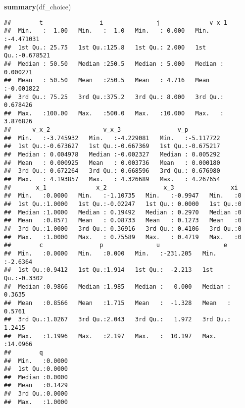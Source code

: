 \documentclass[
]{book}
\newenvironment{Shaded}{\begin{snugshade}}{\end{snugshade}}
\newcommand{\KeywordTok}[1]{\textcolor[rgb]{0.13,0.29,0.53}{\textbf{#1}}}
\newcommand{\NormalTok}[1]{#1}
\begin{document}
\begin{Shaded}
\begin{Highlighting}[]
\KeywordTok{summary}\NormalTok{(df_choice)}
\end{Highlighting}
\end{Shaded}

\begin{verbatim}
##        t                i               j              v_x_1          
##  Min.   :  1.00   Min.   :  1.0   Min.   : 0.000   Min.   :-4.471031  
##  1st Qu.: 25.75   1st Qu.:125.8   1st Qu.: 2.000   1st Qu.:-0.678521  
##  Median : 50.50   Median :250.5   Median : 5.000   Median : 0.000271  
##  Mean   : 50.50   Mean   :250.5   Mean   : 4.716   Mean   :-0.001822  
##  3rd Qu.: 75.25   3rd Qu.:375.2   3rd Qu.: 8.000   3rd Qu.: 0.678426  
##  Max.   :100.00   Max.   :500.0   Max.   :10.000   Max.   : 3.876826  
##      v_x_2               v_x_3                v_p           
##  Min.   :-3.745932   Min.   :-4.229081   Min.   :-5.117722  
##  1st Qu.:-0.673627   1st Qu.:-0.667369   1st Qu.:-0.675217  
##  Median : 0.004978   Median :-0.002327   Median : 0.005292  
##  Mean   : 0.000925   Mean   : 0.003736   Mean   : 0.000180  
##  3rd Qu.: 0.672264   3rd Qu.: 0.668596   3rd Qu.: 0.676980  
##  Max.   : 4.193857   Max.   : 4.326689   Max.   : 4.267654  
##       x_1              x_2                x_3                xi   
##  Min.   :0.0000   Min.   :-1.10735   Min.   :-0.9947   Min.   :0  
##  1st Qu.:1.0000   1st Qu.:-0.02247   1st Qu.: 0.0000   1st Qu.:0  
##  Median :1.0000   Median : 0.19492   Median : 0.2970   Median :0  
##  Mean   :0.8571   Mean   : 0.08733   Mean   : 0.1273   Mean   :0  
##  3rd Qu.:1.0000   3rd Qu.: 0.36916   3rd Qu.: 0.4106   3rd Qu.:0  
##  Max.   :1.0000   Max.   : 0.75589   Max.   : 0.4719   Max.   :0  
##        c                p               u                  e          
##  Min.   :0.0000   Min.   :0.000   Min.   :-231.205   Min.   :-2.6364  
##  1st Qu.:0.9412   1st Qu.:1.914   1st Qu.:  -2.213   1st Qu.:-0.3302  
##  Median :0.9866   Median :1.985   Median :   0.000   Median : 0.3635  
##  Mean   :0.8566   Mean   :1.715   Mean   :  -1.328   Mean   : 0.5761  
##  3rd Qu.:1.0267   3rd Qu.:2.043   3rd Qu.:   1.972   3rd Qu.: 1.2415  
##  Max.   :1.1996   Max.   :2.197   Max.   :  10.197   Max.   :14.0966  
##        q         
##  Min.   :0.0000  
##  1st Qu.:0.0000  
##  Median :0.0000  
##  Mean   :0.1429  
##  3rd Qu.:0.0000  
##  Max.   :1.0000
\end{verbatim}
\end{document}
